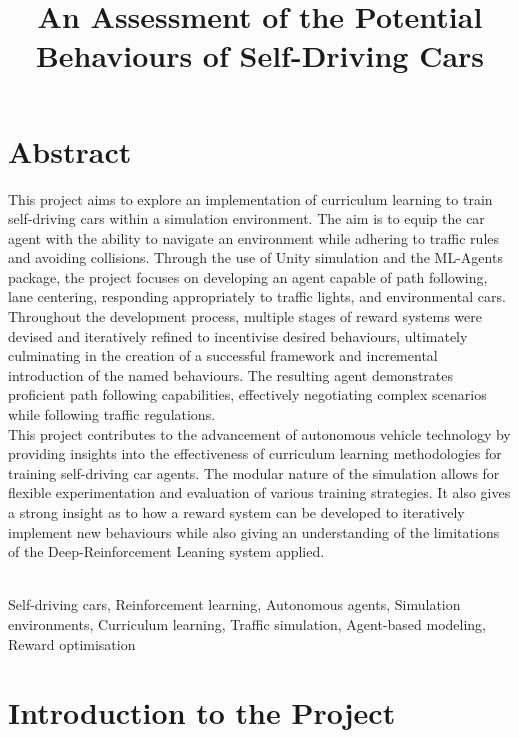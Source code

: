 \documentclass{article}
\title{\LARGE\bfseries An Assessment of the Potential Behaviours of Self-Driving Cars}
\author{
     \\
     \\
\textbf{By Luke Guppy} \\
    \\
    \\
    \\
    \\
\centerline{\rule{10cm}{0.4pt}}\\
    \\
    \\
\textbf{University of Warwick} \\
\\
Department of Computer Science \\
\\
Supervisor: Andrew Hague \\
\\
Year of Study: $3^{rd}$ \\
\\
2024 \\
    \\
\centerline{\rule{10cm}{0.4pt}}
}
\date{}
\begin{document}
\maketitle
\newpage

\section*{Abstract}
This project aims to explore an implementation of curriculum learning to train self-driving cars within a simulation environment. The aim is to equip the car agent with the ability to navigate an environment while adhering to traffic rules and avoiding collisions. Through the use of Unity simulation and the ML-Agents package, the project focuses on developing an agent capable of path following, lane centering, responding appropriately to traffic lights, and environmental cars.\\

Throughout the development process, multiple stages of reward systems were devised and iteratively refined to incentivise desired behaviours, ultimately culminating in the creation of a successful framework and incremental introduction of the named behaviours. The resulting agent demonstrates proficient path following capabilities, effectively negotiating complex scenarios while following traffic regulations.\\

This project contributes to the advancement of autonomous vehicle technology by providing insights into the effectiveness of curriculum learning methodologies for training self-driving car agents. The modular nature of the simulation allows for flexible experimentation and evaluation of various training strategies. It also gives a strong insight as to how a reward system can be developed to iteratively implement new behaviours while also giving an understanding of the limitations of the Deep-Reinforcement Leaning system applied.

\noindent\hrulefill \\

Self-driving cars, Reinforcement learning, Autonomous agents, Simulation environments, Curriculum learning, Traffic simulation, Agent-based modeling, Reward optimisation

\newpage

\tableofcontents
\newpage


\section{Introduction to the Project}
\end{document}
